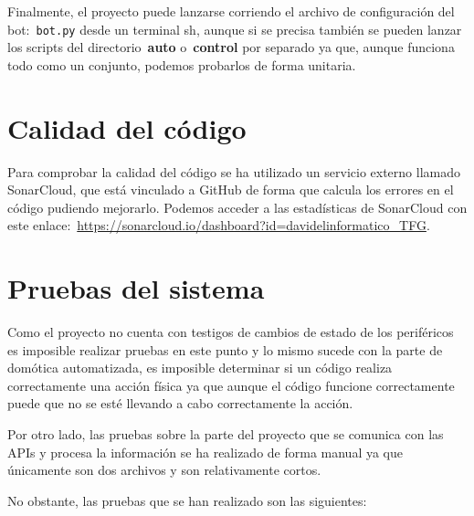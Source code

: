 Finalmente, el proyecto puede lanzarse corriendo el archivo de configuración del bot:~\texttt{bot.py} desde un terminal sh, aunque si se precisa también se pueden lanzar los scripts del directorio~\textbf{auto} o~\textbf{control} por separado ya que, aunque funciona todo como un conjunto, podemos probarlos de forma unitaria.


\section{Calidad del código}
Para comprobar la calidad del código se ha utilizado un servicio externo llamado SonarCloud, que está vinculado a GitHub de forma que calcula los errores en el código pudiendo mejorarlo.
Podemos acceder a las estadísticas de SonarCloud con este enlace:~\url{https://sonarcloud.io/dashboard?id=davidelinformatico_TFG}.


\section{Pruebas del sistema}
Como el proyecto no cuenta con testigos de cambios de estado de los periféricos es imposible realizar pruebas en este punto y lo mismo sucede con la parte de domótica automatizada, es imposible determinar si un código realiza correctamente una acción física ya que aunque el código funcione correctamente puede que no se esté llevando a cabo correctamente la acción.

Por otro lado, las pruebas sobre la parte del proyecto que se comunica con las APIs y procesa la información se ha realizado de forma manual ya que únicamente son dos archivos y son relativamente cortos. 


No obstante, las pruebas que se han realizado son las siguientes:

